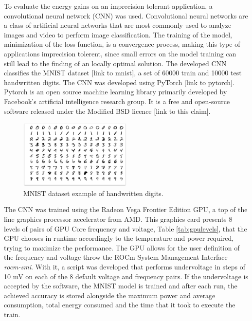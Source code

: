 To evaluate the energy gains on an imprecision tolerant application, a convolutional neural network (CNN) was used. Convolutional neural networks are a class of artificial neural networks that are most commonly used to analyze images and video to perform image classification. The training of the model, minimization of the loss function, is a convergence process, making this type of applications imprecision tolerent, since small errors on the model training can still lead to the finding of an locally optimal solution.
The developed CNN classifies the MNIST dataset [link to mnist], a set of 60000 train and 10000 test handwritten digits. The CNN was developed using PyTorch [link to pytorch]. Pytorch is an open source machine learning library primarily developed by Facebook's artificial intelligence research group. It is a free and open-source  software released under the Modified BSD licence [link to this claim]. 

\begin{figure}[!htb]
  \centering
  \includegraphics[width=0.5\textwidth]{Figures/Results/mnist.png}
  \caption[]{MNIST dataset example of handwritten digits.}
  \label{fig:mnist}
\end{figure}

The CNN was trained using the Radeon Vega Frontier Edition GPU, a top of the line graphics processor accelerator from AMD. This graphics card presents 8 levels of pairs of GPU Core frequency and voltage, Table \ref{tab:gpulevels}, that the GPU chooses in runtime accordingly to the temperature and power required, trying to maximize the performance. The GPU allows for the user definition of the frequency and voltage throw the ROCm System Management Interface - \textit{rocm-smi}. With it, a script was developed that performs undervoltage in steps of 10 mV on each of the 8 default voltage and frequency pairs. If the undervoltage is accepted by the software, the MNIST model is trained and after each run, the achieved accuracy is stored alongside the maximum power and average consumption, total energy consumed and the time that it took to execute the train.





